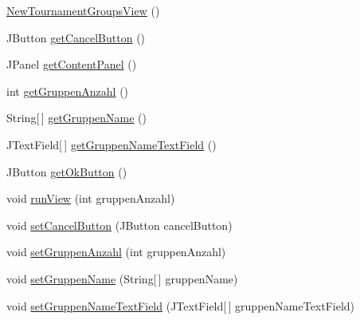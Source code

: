 \begin{DoxyCompactItemize}
\item 
\hyperlink{classde_1_1turnierverwaltung_1_1view_1_1_new_tournament_groups_view_aa05fbb30001369258535675c7ee5eeb3}{New\+Tournament\+Groups\+View} ()
\item 
J\+Button \hyperlink{classde_1_1turnierverwaltung_1_1view_1_1_new_tournament_groups_view_a6ddf82fdb4a8e61132e860ea43435841}{get\+Cancel\+Button} ()
\item 
J\+Panel \hyperlink{classde_1_1turnierverwaltung_1_1view_1_1_new_tournament_groups_view_ae663283aa75d608f738b71d315b8bf7d}{get\+Content\+Panel} ()
\item 
int \hyperlink{classde_1_1turnierverwaltung_1_1view_1_1_new_tournament_groups_view_a966929480ee911c48c6bd9ce09ffd355}{get\+Gruppen\+Anzahl} ()
\item 
String\mbox{[}$\,$\mbox{]} \hyperlink{classde_1_1turnierverwaltung_1_1view_1_1_new_tournament_groups_view_a64e8114b7e70cbab9d75c7e77800082e}{get\+Gruppen\+Name} ()
\item 
J\+Text\+Field\mbox{[}$\,$\mbox{]} \hyperlink{classde_1_1turnierverwaltung_1_1view_1_1_new_tournament_groups_view_a18070e2a2f7d6767d030147bf2aece44}{get\+Gruppen\+Name\+Text\+Field} ()
\item 
J\+Button \hyperlink{classde_1_1turnierverwaltung_1_1view_1_1_new_tournament_groups_view_acdf5544980fd25a63af56183b2a280d6}{get\+Ok\+Button} ()
\item 
void \hyperlink{classde_1_1turnierverwaltung_1_1view_1_1_new_tournament_groups_view_a1041c4ad8292336b47041dc10b7c0c1f}{run\+View} (int gruppen\+Anzahl)
\item 
void \hyperlink{classde_1_1turnierverwaltung_1_1view_1_1_new_tournament_groups_view_af14b53ebb745d4b1f13d74a22001ce25}{set\+Cancel\+Button} (J\+Button cancel\+Button)
\item 
void \hyperlink{classde_1_1turnierverwaltung_1_1view_1_1_new_tournament_groups_view_aaedad3f73aca141f03ab974c7da38805}{set\+Gruppen\+Anzahl} (int gruppen\+Anzahl)
\item 
void \hyperlink{classde_1_1turnierverwaltung_1_1view_1_1_new_tournament_groups_view_a7e5c5940553264720389dcb0b45982f6}{set\+Gruppen\+Name} (String\mbox{[}$\,$\mbox{]} gruppen\+Name)
\item 
void \hyperlink{classde_1_1turnierverwaltung_1_1view_1_1_new_tournament_groups_view_a47b9c96e64ccd68a646f86fb57574c6f}{set\+Gruppen\+Name\+Text\+Field} (J\+Text\+Field\mbox{[}$\,$\mbox{]} gruppen\+Name\+Text\+Field)
\item 

\end{DoxyCompactItemize}
